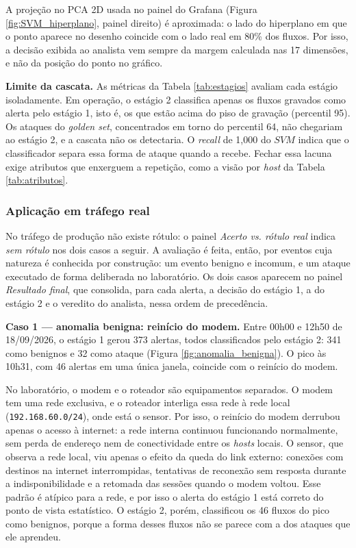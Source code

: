 \documentclass[a4paper,10pt, twocolumn]{article}
\begin{document}
A projeção no PCA 2D usada no painel do Grafana (Figura \ref{fig:SVM_hiperplano},
painel direito) é aproximada: o lado do hiperplano em que o ponto aparece no desenho
coincide com o lado real em 80\% dos fluxos. Por isso, a decisão exibida ao analista
vem sempre da margem calculada nas 17 dimensões, e não da posição do ponto no
gráfico.

\textbf{Limite da cascata.} As métricas da Tabela \ref{tab:estagios} avaliam cada
estágio isoladamente. Em operação, o estágio 2 classifica apenas os fluxos gravados
como alerta pelo estágio 1, isto é, os que estão acima do piso de gravação (percentil
95). Os ataques do \textit{golden set}, concentrados em torno do percentil 64, não
chegariam ao estágio 2, e a cascata não os detectaria. O \textit{recall} de 1,000 do
$SVM$ indica que o classificador separa essa forma de ataque quando a recebe. Fechar essa lacuna exige atributos que
enxerguem a repetição, como a visão por \textit{host} da Tabela
\ref{tab:atributos}.

\subsubsection{Aplicação em tráfego real}
No tráfego de produção não existe rótulo: o painel \textit{Acerto vs. rótulo real}
indica \textit{sem rótulo} nos dois casos a seguir. A avaliação é feita, então, por
eventos cuja natureza é conhecida por construção: um evento benigno e incomum, e um
ataque executado de forma deliberada no laboratório. Os dois casos aparecem no painel
\textit{Resultado final}, que consolida, para cada alerta, a decisão do estágio 1, a
do estágio 2 e o veredito do analista, nessa ordem de precedência.

\textbf{Caso 1 --- anomalia benigna: reinício do modem.} Entre 00h00 e 12h50 de
18/09/2026, o estágio 1 gerou 373 alertas, todos classificados pelo estágio 2: 341
como benignos e 32 como ataque (Figura \ref{fig:anomalia_benigna}). O pico às 10h31,
com 46 alertas em uma única janela, coincide com o reinício do modem.

No laboratório, o modem e o roteador são equipamentos separados. O modem tem uma
rede exclusiva, e o roteador interliga essa rede à rede local
(\texttt{192.168.60.0/24}), onde está o sensor. Por isso, o reinício do modem
derrubou apenas o acesso à internet: a rede interna continuou funcionando
normalmente, sem perda de endereço nem de conectividade entre os \textit{hosts}
locais. O sensor, que observa a rede local, viu apenas o efeito da queda do link
externo: conexões com destinos na internet interrompidas, tentativas de reconexão
sem resposta durante a indisponibilidade e a retomada das sessões quando o modem
voltou. Esse padrão é atípico para a rede, e por isso o alerta do estágio 1 está
correto do ponto de vista estatístico. O estágio 2, porém, classificou os 46 fluxos
do pico como benignos, porque a forma desses fluxos não se parece com a dos ataques
que ele aprendeu.
\end{document}
